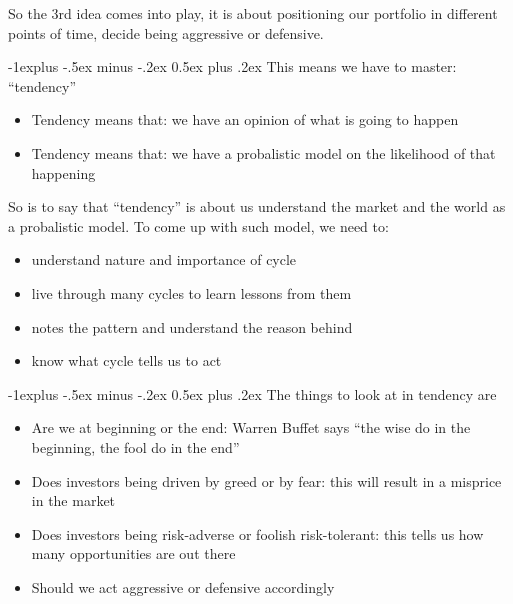 \documentclass[10pt,portrait]{article}
\makeatletter
\renewcommand{\subsection}{\@startsection{subsection}{2}{0mm}%
                                {-1explus -.5ex minus -.2ex}%
                                {0.5ex plus .2ex}%
                                {\normalfont\normalsize\bfseries}}
\makeatother
\begin{document}
        So the 3rd idea comes into play, it is about positioning our portfolio in different points of time, decide being aggressive or defensive.

    \subsection{\color{blue}This means we have to master: ``tendency''}
    \begin{itemize}
        \item Tendency means that: we have an opinion of what is going to happen
        \item Tendency means that: we have a probalistic model on the likelihood of that happening
    \end{itemize}

        So is to say that ``tendency'' is about us understand the market and the world as a probalistic model. To come up with such model, we need to:

    \begin{itemize}
        \item understand nature and importance of cycle
        \item live through many cycles to learn lessons from them
        \item notes the pattern and understand the reason behind
        \item know what cycle tells us to act
    \end{itemize}


    \subsection{\color{blue}The things to look at in tendency are}
    \begin{itemize}
        \item Are we at beginning or the end: Warren Buffet says ``the wise do in the beginning, the fool do in the end''
        \item Does investors being driven by greed or by fear: this will result in a misprice in the market
        \item Does investors being risk-adverse or foolish risk-tolerant: this tells us how many opportunities are out there
        \item Should we act aggressive or defensive accordingly
    \end{itemize}

\end{document}
